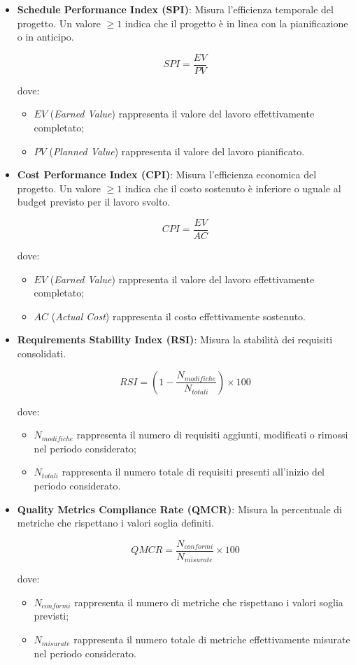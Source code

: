 \begin{itemize}

    \item \textbf{Schedule Performance Index (SPI)}: Misura l'efficienza temporale del progetto. Un valore $\geq 1$ indica che il progetto è in linea con la pianificazione o in anticipo.

    \[
    SPI = \frac{EV}{PV}
    \]

    dove:
    \begin{itemize}
        \item $EV$ (\textit{Earned Value}) rappresenta il valore del lavoro effettivamente completato;
        \item $PV$ (\textit{Planned Value}) rappresenta il valore del lavoro pianificato.
    \end{itemize}

    \item \textbf{Cost Performance Index (CPI)}: Misura l'efficienza economica del progetto. Un valore $\geq 1$ indica che il costo sostenuto è inferiore o uguale al budget previsto per il lavoro svolto.

    \[
    CPI = \frac{EV}{AC}
    \]

    dove:
    \begin{itemize}
        \item $EV$ (\textit{Earned Value}) rappresenta il valore del lavoro effettivamente completato;
        \item $AC$ (\textit{Actual Cost}) rappresenta il costo effettivamente sostenuto.
    \end{itemize}

    \item \textbf{Requirements Stability Index (RSI)}: Misura la stabilità dei requisiti consolidati.

    \[
    RSI = \left( 1 - \frac{N_{modifiche}}{N_{totali}} \right) \times 100
    \]

    dove:
    \begin{itemize}
        \item $N_{modifiche}$ rappresenta il numero di requisiti aggiunti, modificati o rimossi nel periodo considerato;
        \item $N_{totali}$ rappresenta il numero totale di requisiti presenti all'inizio del periodo considerato.
    \end{itemize}

    \item \textbf{Quality Metrics Compliance Rate (QMCR)}: Misura la percentuale di metriche che rispettano i valori soglia definiti.

    \[
    QMCR = \frac{N_{conformi}}{N_{misurate}} \times 100
    \]

    dove:
    \begin{itemize}
        \item $N_{conformi}$ rappresenta il numero di metriche che rispettano i valori soglia previsti;
        \item $N_{misurate}$ rappresenta il numero totale di metriche effettivamente misurate nel periodo considerato.
    \end{itemize}

\end{itemize}
